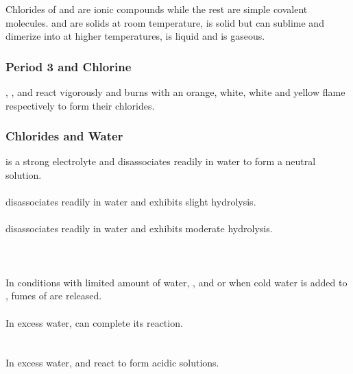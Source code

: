 \documentclass[../main]{subfiles}
\begin{document}
	Chlorides of  and  are ionic compounds while the rest are simple covalent molecules.  and  are solids at room temperature,  is solid but can sublime and dimerize into  at higher temperatures,  is liquid and  is gaseous.

	\subsubsection{Period 3 and Chlorine}

	, ,  and  react vigorously and burns with an orange, white, white and yellow flame respectively to form their chlorides.

	\subsubsection{Chlorides and Water}

	 is a strong electrolyte and disassociates readily in water to form a neutral solution. \\

	 \\
	 disassociates readily in water and exhibits slight hydrolysis. \\

	 \\
	 disassociates readily in water and exhibits moderate hydrolysis. \\

	 \\
	 \\
	 \\
	In conditions with limited amount of water, ,  and  or when cold water is added to , fumes of  are released. \\

	 \\
	In excess water,  can complete its reaction. \\

	 \\
	 \\
	In excess water,  and  react to form acidic solutions. \\
\end{document}
